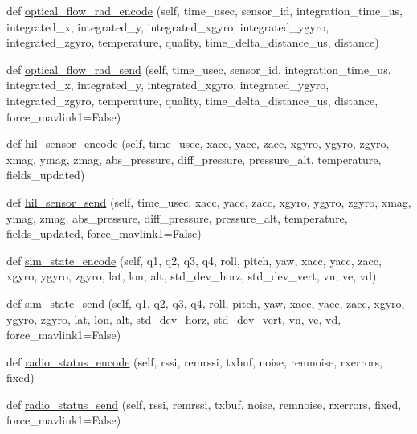 \begin{DoxyCompactItemize}
\item 
def \hyperlink{classpymavlink_1_1dialects_1_1v10_1_1MAVLink_a4ebc1f0ddd8f9a6f4e2a97f6f6ae00c4}{optical\+\_\+flow\+\_\+rad\+\_\+encode} (self, time\+\_\+usec, sensor\+\_\+id, integration\+\_\+time\+\_\+us, integrated\+\_\+x, integrated\+\_\+y, integrated\+\_\+xgyro, integrated\+\_\+ygyro, integrated\+\_\+zgyro, temperature, quality, time\+\_\+delta\+\_\+distance\+\_\+us, distance)
\item 
def \hyperlink{classpymavlink_1_1dialects_1_1v10_1_1MAVLink_a1541ea4b3374e92f8dc8bf1c9460cd6e}{optical\+\_\+flow\+\_\+rad\+\_\+send} (self, time\+\_\+usec, sensor\+\_\+id, integration\+\_\+time\+\_\+us, integrated\+\_\+x, integrated\+\_\+y, integrated\+\_\+xgyro, integrated\+\_\+ygyro, integrated\+\_\+zgyro, temperature, quality, time\+\_\+delta\+\_\+distance\+\_\+us, distance, force\+\_\+mavlink1=False)
\item 
def \hyperlink{classpymavlink_1_1dialects_1_1v10_1_1MAVLink_aa055d830580f983735e2ecc9ba64b2b6}{hil\+\_\+sensor\+\_\+encode} (self, time\+\_\+usec, xacc, yacc, zacc, xgyro, ygyro, zgyro, xmag, ymag, zmag, abs\+\_\+pressure, diff\+\_\+pressure, pressure\+\_\+alt, temperature, fields\+\_\+updated)
\item 
def \hyperlink{classpymavlink_1_1dialects_1_1v10_1_1MAVLink_a1db1e2a0b8e2df32080de910479b1654}{hil\+\_\+sensor\+\_\+send} (self, time\+\_\+usec, xacc, yacc, zacc, xgyro, ygyro, zgyro, xmag, ymag, zmag, abs\+\_\+pressure, diff\+\_\+pressure, pressure\+\_\+alt, temperature, fields\+\_\+updated, force\+\_\+mavlink1=False)
\item 
def \hyperlink{classpymavlink_1_1dialects_1_1v10_1_1MAVLink_a85b72243d402ef88754cd781cf5fcf24}{sim\+\_\+state\+\_\+encode} (self, q1, q2, q3, q4, roll, pitch, yaw, xacc, yacc, zacc, xgyro, ygyro, zgyro, lat, lon, alt, std\+\_\+dev\+\_\+horz, std\+\_\+dev\+\_\+vert, vn, ve, vd)
\item 
def \hyperlink{classpymavlink_1_1dialects_1_1v10_1_1MAVLink_aab9e585cfdfe1901558cbf6e335e11b7}{sim\+\_\+state\+\_\+send} (self, q1, q2, q3, q4, roll, pitch, yaw, xacc, yacc, zacc, xgyro, ygyro, zgyro, lat, lon, alt, std\+\_\+dev\+\_\+horz, std\+\_\+dev\+\_\+vert, vn, ve, vd, force\+\_\+mavlink1=False)
\item 
def \hyperlink{classpymavlink_1_1dialects_1_1v10_1_1MAVLink_a097cc532b2671f7a52972216689f63ad}{radio\+\_\+status\+\_\+encode} (self, rssi, remrssi, txbuf, noise, remnoise, rxerrors, fixed)
\item 
def \hyperlink{classpymavlink_1_1dialects_1_1v10_1_1MAVLink_a5230f63ccc810973b56b840b26bee45b}{radio\+\_\+status\+\_\+send} (self, rssi, remrssi, txbuf, noise, remnoise, rxerrors, fixed, force\+\_\+mavlink1=False)

\end{DoxyCompactItemize}
